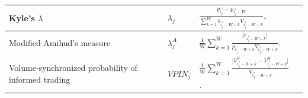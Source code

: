 \documentclass{rQUF2e}
\theoremstyle{plain}
\theoremstyle{definition}
\theoremstyle{remark}
\begin{document}
\begin{longtable}{|p{4cm}|p{2.25cm}|p{5.25cm}|p{2.25cm}|}
    Kyle's $\lambda$                                                                                                                                                       &
    $\lambda_j$                                                                                                                                                            &
    $\frac{p_{i^*_j} - p_{i^*_j - W}}{\sum^W_{k = 1} b_{i^*_j - W + k} V_{i^*_j - W + k}}$.                                                                                &
    \citep{Kyle1985, easley2021microstructure}                                                                                                                                                                                                                                                                                                                                                  \\ \hline

    Modified Amihud's measure                                                                                                                                              &
    $\lambda^A_j$                                                                                                                                                          &
    $\frac{1}{W} \sum^W_{k = 1} \frac{\big| r_{i^*_j - W + k} \big|}{p_{i^*_j - W + k} V_{i^*_j - W + k}}$.                                                                &
    \citep{barardehi2018trade, easley2021microstructure}                                                                                                                                                                                                                                                                                                                                        \\ \hline

    Volume-synchronized probability of informed trading                                                                                                                    &
    $VPIN_j$                                                                                                                                                               &
    $\frac{1}{W} \sum^W_{k = 1} \frac{\big| V_{i^*_j - W + k}^S - V^B_{i^*_j - W + k} \big|}{V_{i^*_j - W + k}}$.                                                          &
    \citep{EASLEY2016269, easley2021microstructure}                                                                                                                                                                                                                                                                                                                                             \\ \hline


\end{longtable}
\end{document}

